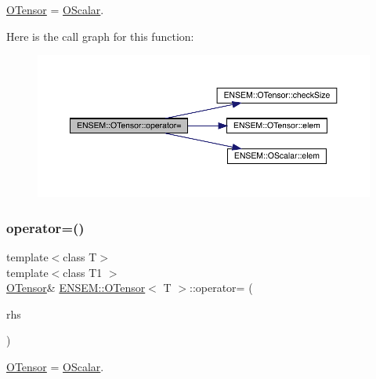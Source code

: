 \mbox{\hyperlink{classENSEM_1_1OTensor}{O\+Tensor}} = \mbox{\hyperlink{classENSEM_1_1OScalar}{O\+Scalar}}. 

Here is the call graph for this function\+:
\nopagebreak
\begin{figure}[H]
\begin{center}
\leavevmode
\includegraphics[width=350pt]{da/d8a/classENSEM_1_1OTensor_ae763ca68be1d6b8d5b27b8d544ab5f2d_cgraph}
\end{center}
\end{figure}
\mbox{\label{classENSEM_1_1OTensor_ae763ca68be1d6b8d5b27b8d544ab5f2d}} 
\subsubsection{\texorpdfstring{operator=()}{operator=()}\hspace{0.1cm}{\footnotesize\ttfamily [4/8]}}
{\footnotesize\ttfamily template$<$class T$>$ \\
template$<$class T1 $>$ \\
\mbox{\hyperlink{classENSEM_1_1OTensor}{O\+Tensor}}\& \mbox{\hyperlink{classENSEM_1_1OTensor}{E\+N\+S\+E\+M\+::\+O\+Tensor}}$<$ T $>$\+::operator= (\begin{DoxyParamCaption}\item[{const \mbox{\hyperlink{classENSEM_1_1OScalar}{O\+Scalar}}$<$ T1 $>$ \&}]{rhs }\end{DoxyParamCaption})\hspace{0.3cm}{\ttfamily [inline]}}



\mbox{\hyperlink{classENSEM_1_1OTensor}{O\+Tensor}} = \mbox{\hyperlink{classENSEM_1_1OScalar}{O\+Scalar}}. 

